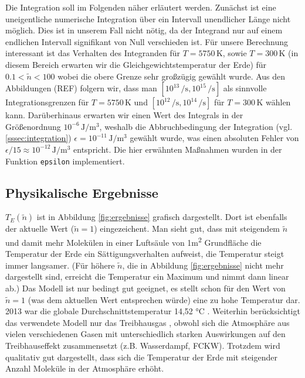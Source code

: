\documentclass[10pt,a4paper]{article}
\begin{document}
Die Integration soll im Folgenden näher erläutert werden. Zunächst ist eine uneigentliche numerische Integration über ein Intervall unendlicher Länge nicht möglich. Dies ist in unserem Fall nicht nötig, da der Integrand nur auf einem endlichen Intervall signifikant von Null verschieden ist. Für unsere Berechnung interessant ist das Verhalten des Integranden für $T = \num{5750}\,\si{\kelvin}$, sowie $T = \num{300}\,\si{\kelvin}$ (in diesem Bereich erwarten wir die Gleichgewichtstemperatur der Erde) für $\num{0.1} < \tilde{n} < \num{100}$ wobei die obere Grenze sehr großzügig gewählt wurde. Aus den Abbildungen (REF) folgern wir, dass man $[10^{13}\,\si{\per\second},10^{15}\,\si{\per\second}]$ als sinnvolle Integrationsgrenzen für $T = \num{5750}\,\si{\kelvin}$ und $[10^{12}\,\si{\per\second}, 10^{14}\,\si{\per\second}]$ für $T = \num{300}\,\si{\kelvin}$ wählen kann. Darüberhinaus erwarten wir einen Wert des Integrals in der Größenordnung $10^{-6}\,\si{\joule\per\metre^3}$, weshalb die Abbruchbedingung der Integration (vgl. \ref{sssec:integration}) $\epsilon = 10^{-11}\,\si{\joule\per\metre^3}$ gewählt wurde, was einen absoluten Fehler von $\epsilon / 15 \approx 10^{-12}\,\si{\joule\per\metre^3}$ entspricht. Die hier erwähnten Maßnahmen wurden in der Funktion \texttt{epsilon} implementiert.



\subsection{Physikalische Ergebnisse}
\label{ssec:physikalischeergebnisse}

$T_E(\tilde{n})$ ist in Abbildung \ref{fig:ergebnisse} grafisch dargestellt. Dort ist ebenfalls der aktuelle Wert ($\tilde{n}=1$) eingezeichent. Man sieht gut, dass mit steigendem $\tilde{n}$ und damit mehr  Molekülen in einer Luftsäule von 1\si{\meter^2} Grundfläche die Temperatur der Erde ein Sättigungsverhalten aufweist, die Temperatur steigt immer langsamer. (Für höhere $\tilde{n}$, die in Abbildung \ref{fig:ergebnisse} nicht mehr dargestellt sind, erreicht die Temperatur ein Maximum und nimmt dann linear ab.) Das Modell ist nur bedingt gut geeignet, es stellt schon für den Wert von $\tilde{n}=1$ (was dem aktuellen Wert entsprechen würde) eine zu hohe Temperatur dar. 2013 war die globale Durchschnittstemperatur 14,52 \si{\celsius} \cite{noaa}. Weiterhin berücksichtigt das verwendete Modell nur das Treibhausgas , obwohl sich die Atmosphäre aus vielen verschiedenen Gasen mit unterschiedlich starken Auswirkungen auf den Treibhauseffekt zusammensetzt (z.B. Wasserdampf, FCKW). Trotzdem wird qualitativ gut dargestellt, dass sich die Temperatur der Erde mit steigender Anzahl  Moleküle in der Atmosphäre erhöht.
\end{document}
